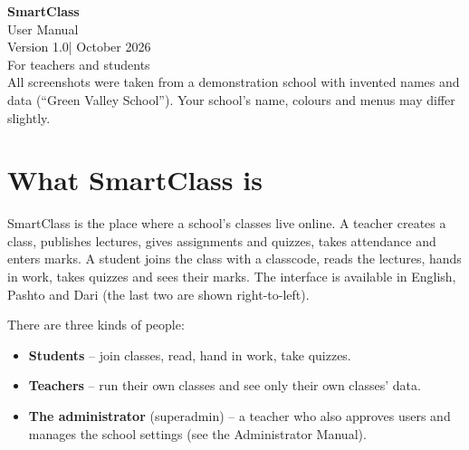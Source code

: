 \documentclass[11pt,a4paper]{article}
\newcommand{\manualversion}{1.0}
\begin{document}
\begin{titlepage}
\centering\sffamily
\vspace*{3cm}
{\Huge\bfseries\color{brand} SmartClass}\\[6pt]
{\LARGE User Manual}\\[2cm]
{\large Version \manualversion\quad| October 2026}\\[1cm]
For teachers and students\\[4cm]
{\small All screenshots were taken from a demonstration school with invented names and data (``Green Valley School''). Your school's name, colours and menus may differ slightly.}
\end{titlepage}
\tableofcontents\clearpage

\section{What SmartClass is}
SmartClass is the place where a school's classes live online. A teacher creates a \gls{class}, publishes lectures, gives assignments and quizzes, takes attendance and enters marks. A student joins the class with a \gls{classcode}, reads the lectures, hands in work, takes quizzes and sees their marks. The interface is available in English, Pashto and Dari (the last two are shown right-to-left).

There are three kinds of people:
\begin{itemize}
\item \textbf{Students} -- join classes, read, hand in work, take quizzes.
\item \textbf{Teachers} -- run their own classes and see only their own classes' data.
\item \textbf{The administrator} (\gls{superadmin}) -- a teacher who also approves users and manages the school settings (see the Administrator Manual).
\end{itemize}
\end{document}
